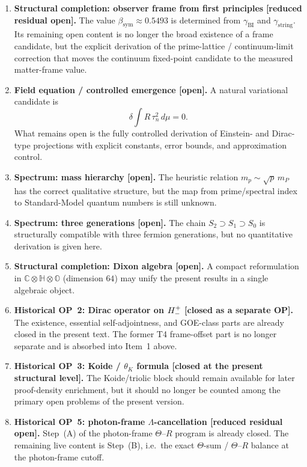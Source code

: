 \begin{enumerate}
  \item \textbf{Structural completion: observer frame from first principles}
        \textbf{[reduced residual open].}
        The value $\beta_{\mathrm{sym}} \approx 0.5493$ is determined from
        $\gamma_{\mathrm{BI}}$ and $\gamma_{\mathrm{string}}$. Its remaining
        open content is no longer the broad existence of a frame candidate,
        but the explicit derivation of the prime-lattice / continuum-limit
        correction that moves the continuum fixed-point candidate to the
        measured matter-frame value.

  \item \textbf{Field equation / controlled emergence [open].}
        A natural variational candidate is
  \[
  \delta \int R \, \tau_n^2 \, d\mu = 0.
  \]
        What remains open is the fully controlled derivation of Einstein- and
        Dirac-type projections with explicit constants, error bounds, and
        approximation control.

  \item \textbf{Spectrum: mass hierarchy [open].}
        The heuristic relation $m_p \sim \sqrt{p}\,m_P$ has the correct
        qualitative structure, but the map from prime/spectral index to
        Standard-Model quantum numbers is still unknown.

  \item \textbf{Spectrum: three generations [open].}
        The chain $S_2 \supset S_1 \supset S_0$ is structurally compatible
        with three fermion generations, but no quantitative derivation is
        given here.

  \item \textbf{Structural completion: Dixon algebra [open].}
        A compact reformulation in $\mathbb{C} \otimes \mathbb{H} \otimes
        \mathbb{O}$ (dimension $64$) may unify the present results in a
        single algebraic object.

  \item \textbf{Historical OP~2: Dirac operator on $H^+_-$ [closed as a separate OP].}
        The existence, essential self-adjointness, and GOE-class parts are
        already closed in the present text. The former T4 frame-offset part is
        no longer separate and is absorbed into Item~1 above.

  \item \textbf{Historical OP~3: Koide / $\theta_K$ formula [closed at the present structural level].}
        The Koide/triolic block should remain available for later proof-density
        enrichment, but it should no longer be counted among the primary open
        problems of the present version.

  \item \textbf{Historical OP~5: photon-frame $\Lambda$-cancellation [reduced residual open].}
        Step~(A) of the photon-frame $\Theta$--$R$ program is already closed.
        The remaining live content is Step~(B), i.e.\ the exact
        $\Theta$-sum / $\Theta$--$R$ balance at the photon-frame cutoff.
\end{enumerate}

